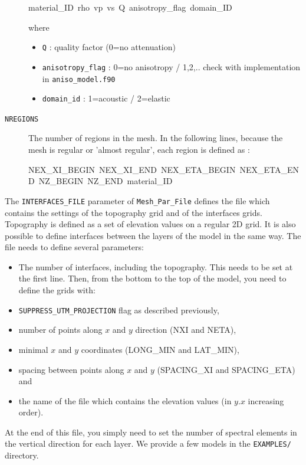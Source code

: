 \begin{description}
\begin{lyxcode}
material\_ID~rho~vp~vs~Q~anisotropy\_flag~domain\_ID
\end{lyxcode}

where
\begin{itemize}
\item \texttt{Q} : quality factor (0=no attenuation)
\item \texttt{anisotropy\_flag} : 0=no anisotropy / 1,2,.. check with implementation
in \texttt{aniso\_model.f90}
\item \texttt{domain\_id} : 1=acoustic / 2=elastic
\end{itemize}
\item [{\texttt{NREGIONS}}] The number of regions in the mesh. In the following
lines, because the mesh is regular or 'almost regular', each region
is defined as :

\begin{lyxcode}
NEX\_XI\_BEGIN~NEX\_XI\_END~NEX\_ETA\_BEGIN~NEX\_ETA\_END~NZ\_BEGIN~NZ\_END~material\_ID
\end{lyxcode}
\end{description}
The \texttt{INTERFACES\_FILE} parameter of \texttt{Mesh\_Par\_File}
defines the file which contains the settings of the topography grid
and of the interfaces grids. Topography is defined as a set of elevation
values on a regular 2D grid. It is also possible to define interfaces
between the layers of the model in the same way. The file needs to
define several parameters:
\begin{itemize}
\item The number of interfaces, including the topography. This needs to
be set at the first line. Then, from the bottom to the top of the
model, you need to define the grids with:
\item \texttt{SUPPRESS\_UTM\_PROJECTION} flag as described previously,
\item number of points along $x$ and $y$ direction (NXI and NETA),
\item minimal $x$ and $y$ coordinates (LONG\_MIN and LAT\_MIN),
\item spacing between points along $x$ and $y$ (SPACING\_XI and SPACING\_ETA)
and
\item the name of the file which contains the elevation values (in $y$.$x$
increasing order).
\end{itemize}
At the end of this file, you simply need to set the number of spectral
elements in the vertical direction for each layer. We provide a few
models in the {\texttt{EXAMPLES/}} directory. \\


